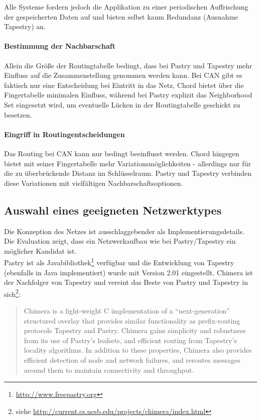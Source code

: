 Alle Systeme fordern jedoch die Applikation zu einer periodischen Auffrischung der gespeicherten Daten auf und bieten selbst kaum Redundanz (Ausnahme Tapestry) an.


\paragraph{Bestimmung der Nachbarschaft}
Allein die Größe der Routingtabelle bedingt, dass bei Pastry und Tapestry mehr Einfluss auf die Zusammenstellung genommen werden kann. Bei CAN gibt es faktisch nur eine Entscheidung bei Eintritt in das Netz, Chord bietet über die Fingertabelle minimalen Einfluss, während bei Pastry explizit das Neighborhood Set eingesetzt wird, um eventuelle Lücken in der Routingtabelle geschickt zu besetzen.

\paragraph{Eingriff in Routingentscheidungen}
Das Routing bei CAN kann nur bedingt beeinflusst werden. Chord hingegen bietet mit seiner Fingertabelle mehr Variationsmöglichkeiten - allerdings nur für die zu überbrückende Distanz im Schlüsselraum. Pastry und Tapestry verbinden diese Variationen mit vielfältigen Nachbarschaftsoptionen.

\subsection*{Auswahl eines geeigneten Netzwerktypes}
Die Konzeption des Netzes ist ausschlaggebender als Implementierungsdetails. Die Evaluation zeigt, dass ein Netzwerkaufbau wie bei Pastry/Tapestry  ein möglicher Kandidat ist.\\
Pastry ist als Javabibliothek\footnote{\url{http://www.freepastry.org}} verfügbar und die Entwicklung von Tapestry (ebenfalls in Java implementiert) wurde mit Version 2.01 eingestellt. Chimera \cite{Allen2006Chimera} ist der Nachfolger von Tapestry und vereint das Beste von Pastry und Tapestry in sich\footnote{siehe \url{http://current.cs.ucsb.edu/projects/chimera/index.html}}: 
\begin{quote}
Chimera is a light-weight C implementation of a ``next-generation'' structured overlay that provides similar functionality as prefix-routing protocols Tapestry and Pastry.  Chimera gains simplicity and robustness from its use of Pastry's leafsets, and efficient routing from Tapestry's locality algorithms.  In addition to these properties, Chimera also provides efficient detection of node and network failures, and reroutes messages around them to maintain connectivity and throughput.  
\end{quote}

